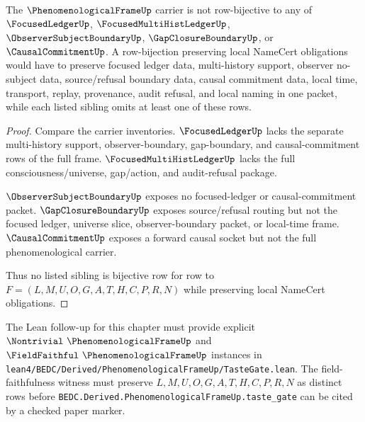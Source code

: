 \begin{theorem}
\label{thm:phenomenological-frame-independence-witness}
The $\PhenomenologicalFrameUp$ carrier is not row-bijective to any of $\FocusedLedgerUp$, $\FocusedMultiHistLedgerUp$, $\ObserverSubjectBoundaryUp$, $\GapClosureBoundaryUp$, or $\CausalCommitmentUp$. A row-bijection preserving local NameCert obligations would have to preserve focused ledger data, multi-history support, observer no-subject data, source/refusal boundary data, causal commitment data, local time, transport, replay, provenance, audit refusal, and local naming in one packet, while each listed sibling omits at least one of these rows.
\end{theorem}
\begin{proof}
Compare the carrier inventories. $\FocusedLedgerUp$ lacks the separate multi-history support, observer-boundary, gap-boundary, and causal-commitment rows of the full frame. $\FocusedMultiHistLedgerUp$ lacks the full consciousness/universe, gap/action, and audit-refusal package.

$\ObserverSubjectBoundaryUp$ exposes no focused-ledger or causal-commitment packet. $\GapClosureBoundaryUp$ exposes source/refusal routing but not the focused ledger, universe slice, observer-boundary packet, or local-time frame. $\CausalCommitmentUp$ exposes a forward causal socket but not the full phenomenological carrier.

Thus no listed sibling is bijective row for row to $F=(L,M,U,O,G,A,T,H,C,P,R,N)$ while preserving local NameCert obligations.
\end{proof}



The Lean follow-up for this chapter must provide explicit $\Nontrivial\ \PhenomenologicalFrameUp$ and $\FieldFaithful\ \PhenomenologicalFrameUp$ instances in \texttt{lean4/BEDC/Derived/PhenomenologicalFrameUp/TasteGate.lean}. The field-faithfulness witness must preserve $L,M,U,O,G,A,T,H,C,P,R,N$ as distinct rows before \texttt{BEDC.Derived.PhenomenologicalFrameUp.taste\_gate} can be cited by a checked paper marker.

